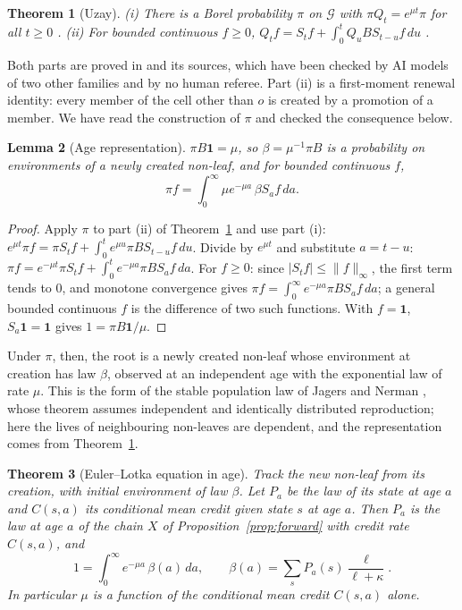 \documentclass[11pt]{article}
\theoremstyle{plain}
\newtheorem{theorem}{Theorem}
\newtheorem{lemma}[theorem]{Lemma}
\theoremstyle{definition}
\theoremstyle{remark}
\begin{document}
\begin{theorem}[Uzay]\label{thm:uzay}
(i) There is a Borel probability $\pi$ on $\mathcal G$ with $\pi Q_t=e^{\mu t}\pi$ for all $t\ge0$ \cite[Lemma~``Construction and tightness of the spatial law'']{UzayR3}. (ii) For bounded continuous $f\ge0$, $Q_tf=S_tf+\int_0^tQ_uBS_{t-u}f\,du$ \cite[proof of Theorem~``Fixed-degree means'']{UzayR3}.
\end{theorem}

Both parts are proved in \cite{UzayR3} and its sources, which have been checked by AI models of two other families and by no human referee. Part (ii) is a first-moment renewal identity: every member of the cell other than $o$ is created by a promotion of a member. We have read the construction of $\pi$ and checked the consequence below.

\begin{lemma}[Age representation]\label{lem:age}
$\pi B\mathbf 1=\mu$, so $\beta=\mu^{-1}\pi B$ is a probability on environments of a newly created non-leaf, and for bounded continuous $f$,
\[
 \pi f=\int_0^\infty\mu e^{-\mu a}\,\beta S_af\,da .
\]
\end{lemma}

\begin{proof}
Apply $\pi$ to part (ii) of Theorem~\ref{thm:uzay} and use part (i): $e^{\mu t}\pi f=\pi S_tf+\int_0^te^{\mu u}\pi BS_{t-u}f\,du$. Divide by $e^{\mu t}$ and substitute $a=t-u$: $\pi f=e^{-\mu t}\pi S_tf+\int_0^te^{-\mu a}\pi BS_af\,da$. For $f\ge0$: since $|S_tf|\le\|f\|_\infty$, the first term tends to $0$, and monotone convergence gives $\pi f=\int_0^\infty e^{-\mu a}\pi BS_af\,da$; a general bounded continuous $f$ is the difference of two such functions. With $f=\mathbf 1$, $S_a\mathbf 1=\mathbf 1$ gives $1=\pi B\mathbf 1/\mu$.
\end{proof}

Under $\pi$, then, the root is a newly created non-leaf whose environment at creation has law $\beta$, observed at an independent age with the exponential law of rate $\mu$. This is the form of the stable population law of Jagers and Nerman \cite[Section~7]{JN1984}, whose theorem assumes independent and identically distributed reproduction; here the lives of neighbouring non-leaves are dependent, and the representation comes from Theorem~\ref{thm:uzay}.

\begin{theorem}[Euler--Lotka equation in age]\label{thm:ELage}
Track the new non-leaf from its creation, with initial environment of law $\beta$. Let $P_a$ be the law of its state at age $a$ and $C(s,a)$ its conditional mean credit given state $s$ at age $a$. Then $P_a$ is the law at age $a$ of the chain $X$ of Proposition~\ref{prop:forward} with credit rate $C(s,a)$, and
\[
 1=\int_0^\infty e^{-\mu a}\,\beta(a)\,da,\qquad \beta(a)=\sum_sP_a(s)\frac{\ell}{\ell+\kappa}.
\]
In particular $\mu$ is a function of the conditional mean credit $C(s,a)$ alone.
\end{theorem}
\end{document}
